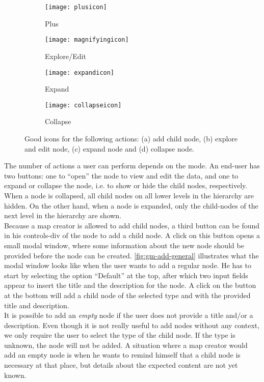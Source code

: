 \begin{figure}[H]
	\centering
	\begin{subfigure}{.2\textwidth}
  		\centering
  		\texttt{[image: plusicon]}
  		\caption{Plus}
  		\label{fig:plusicon}
	\end{subfigure}%
	\begin{subfigure}{.2\textwidth}
  		\centering
  		\texttt{[image: magnifyingicon]}
  		\caption{Explore/Edit}
  		\label{fig:editicon}
	\end{subfigure}
	\begin{subfigure}{.2\textwidth}
		\centering
  		\texttt{[image: expandicon]}
  		\caption{Expand}
  		\label{fig:expandicon}
	\end{subfigure}
	\begin{subfigure}{.2\textwidth}
  		\centering
  		\texttt{[image: collapseicon]}
  		\caption{Collapse}
  		\label{fig:collapseicon}
	\end{subfigure}
	\caption{Good icons for the following actions: (a) add child node, (b) explore and edit node, (c) expand node and (d) collapse node.}
	\label{fig:icons}
\end{figure}

The number of actions a user can perform depends on the mode. An end-user has two buttons: one to ``open'' the node to view and edit the data, and one to expand or collapse the node, i.e. to show or hide the child nodes, respectively. When a node is collapsed, all child nodes on all lower levels in the hierarchy are hidden. On the other hand, when a node is expanded, only the child-nodes of the next level in the hierarchy are shown.\\

Because a map creator is allowed to add child nodes, a third button can be found in his controls-div of the node to add a child node. A click on this button opens a small modal window, where some information about the new node should be provided before the node can be created. \autoref{fig:gm-add-general} illustrates what the modal window looks like when the user wants to add a regular node. He has to start by selecting the option ``Default'' at the top, after which two input fields appear to insert the title and the description for the node. A click on the button at the bottom will add a child node of the selected type and with the provided title and description.\\

It is possible to add an \textit{empty} node if the user does not provide a title and/or a description. Even though it is not really useful to add nodes without any context, we only require the user to select the type of the child node. If the type is unknown, the node will not be added. A situation where a map creator would add an empty node is when he wants to remind himself that a child node is necessary at that place, but details about the expected content are not yet known.\\

